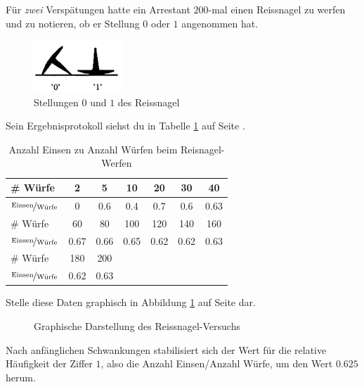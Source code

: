 \documentclass[%
11pt,%
twoside,%
titlepage,%
german,%
headsepline%
]{scrartcl}
\newcommand{\spaltenheight}{\rule{0mm}{3ex}}
\newcommand{\spaltensep}{\\[1ex]}
\begin{document}
Für \emph{zwei} Verspätungen hatte ein Arrestant $200$-mal einen Reissnagel zu werfen und zu notieren, ob er Stellung $0$ oder $1$ angenommen hat.
\begin{figure}
\centering
\includegraphics[width=0.3\textwidth]{pictures/reisnagel}
\caption{Stellungen $0$ und $1$ des Reissnagel}
\end{figure}
Sein Ergebnisprotokoll siehst du in Tabelle \ref{tab:arrest} auf Seite \pageref{tab:arrest}.
\begin{table}
\centering
\begin{tabular}{|l|c|c|c|c|c|c|} \hline
\rowcolor{Gray}\spaltenheight\# Würfe & 2 & 5 & 10 & 20 & 30 & 40\spaltensep \hline
\rowcolor{lightyellow}\spaltenheight$\nicefrac{\text{Einsen}}{\text{Würfe}}$ & 0 & 0.6 & 0.4 & 0.7 & 0.6 & 0.63\spaltensep \hline
\rowcolor{Gray}\spaltenheight\# Würfe & 60 & 80 & 100 & 120 & 140 & 160\spaltensep \hline
\rowcolor{lightyellow}\spaltenheight$\nicefrac{\text{Einsen}}{\text{Würfe}}$ & 0.67& 0.66 & 0.65 & 0.62 & 0.62 & 0.63\spaltensep \hline
\rowcolor{Gray}\spaltenheight\# Würfe & 180 & 200 & & & &\spaltensep \hline
\rowcolor{lightyellow}\spaltenheight$\nicefrac{\text{Einsen}}{\text{Würfe}}$ & 0.62 & 0.63 & & & &\spaltensep \hline
\end{tabular}
\caption{Anzahl Einsen zu Anzahl Würfen beim Reisnagel-Werfen}\label{tab:arrest}
\end{table}

\begin{ueb}
Stelle diese Daten graphisch in Abbildung \ref{graph} auf Seite \pageref{graph} dar.
\end{ueb}

\begin{figure}
\centering
{}
\caption{Graphische Darstellung des Reiss\-nagel-\-Versuchs}\label{graph}
\end{figure}
Nach anfänglichen Schwankungen stabilisiert sich der Wert für die relative Häufigkeit der Ziffer $1$, also die Anzahl Einsen/Anzahl Würfe, um den Wert $0.625$ herum.
\end{document}
